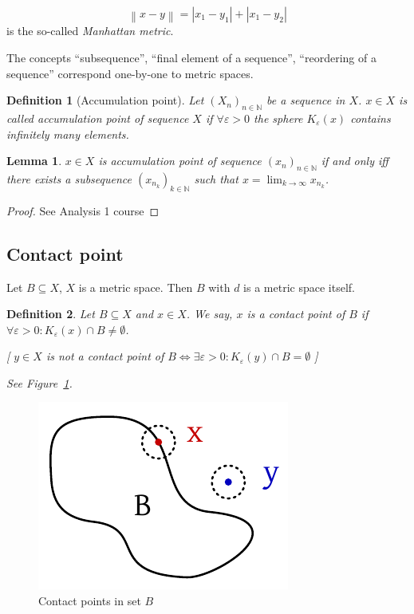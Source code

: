 \documentclass{article}
\newtheorem{definition}{Definition}  \numberwithin{definition}{section}
\newtheorem{lemma}{Lemma}  \numberwithin{lemma}{section}
\newcommand{\norm}[1]{\left\|#1\right\|}
\newcommand{\card}[1]{\left|#1\right|}
\begin{document}
\[ \norm{x - y} = \card{x_1 - y_1} + \card{x_1 - y_2} \]
is the so-called \emph{Manhattan metric}.

The concepts \enquote{subsequence}, \enquote{final element of a sequence}, \enquote{reordering of a sequence} correspond one-by-one to metric spaces.

\begin{definition}[Accumulation point]
  Let $(X_n)_{n\in\mathbb N}$ be a sequence in $X$. $x \in X$ is called \emph{accumulation point of sequence $X$}
  if $\forall \varepsilon > 0$ the sphere $K_{\varepsilon}(x)$ contains infinitely many elements.
\end{definition}

\begin{lemma}
  $x \in X$ is accumulation point of sequence $(x_n)_{n\in\mathbb N}$
  if and only iff there exists a subsequence $(x_{n_k})_{k \in \mathbb N}$ such that
  $x = \lim_{k\to\infty} x_{n_k}$.
\end{lemma}

\begin{proof}
  See Analysis 1 course
\end{proof}

\subsection{Contact point}

Let $B \subseteq X$, $X$ is a metric space. Then $B$ with $d$ is a metric space itself.

\begin{definition}
  Let $B \subseteq X$ and $x \in X$. We say, $x$ is a \emph{contact point of $B$}
  if $\forall \varepsilon > 0: K_{\varepsilon}(x) \cap B \neq \emptyset$.

  [ $y \in X$ is not a contact point of $B \iff \exists \varepsilon > 0: K_{\varepsilon}(y) \cap B = \emptyset$ ]

  See Figure~\ref{img:cp}.
\end{definition}

\begin{figure}
  \begin{center}
    \includegraphics{img/03_contact_point.pdf}
    \caption{Contact points in set $B$}
    \label{img:cp}
  \end{center}
\end{figure}
\end{document}
